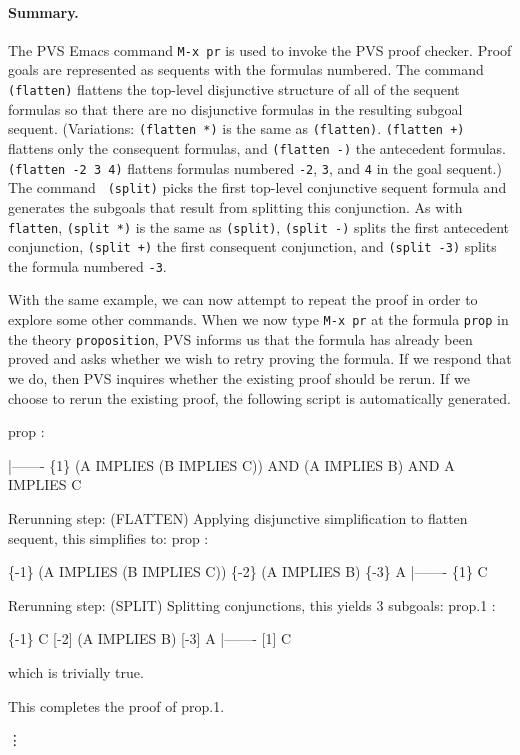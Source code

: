 \paragraph{Summary. }
The PVS Emacs command {\tt M-x pr} is used to invoke the PVS proof
checker.  Proof goals are represented as sequents with the formulas
numbered.  The command {\tt (flatten)} flattens the top-level
disjunctive structure of all of the sequent formulas so that there are
no disjunctive formulas in the resulting subgoal sequent.  (Variations:
{\tt (flatten *)} is the same as {\tt (flatten)}.  {\tt (flatten +)}
flattens only the consequent formulas, and {\tt (flatten -)} the
antecedent formulas.  {\tt (flatten -2 3 4)} flattens formulas numbered
{\tt -2}, {\tt 3}, and {\tt 4} in the goal sequent.)  The command {\tt
(split)} picks the first top-level conjunctive sequent formula and
generates the subgoals that result from splitting this conjunction.
As with {\tt flatten}, {\tt (split *)} is the same as {\tt (split)},
{\tt (split -)} splits the first antecedent conjunction, {\tt (split +)}
the first consequent conjunction, and {\tt (split -3)} splits the
formula numbered {\tt -3}.  

With the same example, we can now attempt to repeat the proof in order
to explore some other commands.  When we now type {\tt M-x pr} at the
formula {\tt prop} in the theory {\tt proposition}, PVS informs us that
the formula has already been proved and asks whether we wish to retry
proving the formula.  If we respond that we do, then PVS inquires
whether the existing proof should be rerun.  If we choose to rerun the
existing proof, the following script is automatically generated.

\begin{pvsscript}
    prop :   

      |-------
    \{1\}   (A IMPLIES (B IMPLIES C)) AND (A IMPLIES B) AND A IMPLIES C

    Rerunning step: (FLATTEN)
    Applying disjunctive simplification to flatten sequent,
    this simplifies to: 
    prop :   

    \{-1\}   (A IMPLIES (B IMPLIES C))
    \{-2\}   (A IMPLIES B)
    \{-3\}   A
      |-------
    \{1\}   C

    Rerunning step: (SPLIT)
    Splitting conjunctions,
    this yields  3 subgoals: 
    prop.1 :   

    \{-1\}   C
    [-2]   (A IMPLIES B)
    [-3]   A
      |-------
    [1]   C

    which is trivially true.

    This completes the proof of prop.1.

       \vdots
\end{pvsscript}

